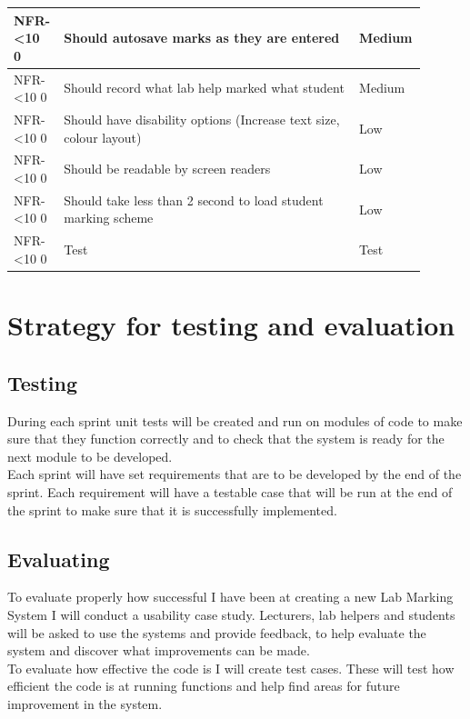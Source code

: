 \documentclass[12pt]{article}  %
\newcommand{\rid}[1]{\centering #1-\ifnum\value{requirement}<10 0\fi\arabic{requirement} \stepcounter{requirement}}
\begin{document}
\begin{spacing}{1.2}
\begin{longtable}{|p{0.1\linewidth}|p{0.7\linewidth}|p{0.1\linewidth}|}
\rid{NFR} & Should autosave marks as they are entered & Medium\\ \hline

\rid{NFR} & Should record what lab help marked what student & Medium\\ \hline

\rid{NFR} & Should have disability options (Increase text size, colour layout) & Low\\ \hline

\rid{NFR} & Should be readable by screen readers & Low\\ \hline

\rid{NFR} & Should take less than 2 second to load student marking scheme & Low\\ \hline

\rid{NFR} & Test&Test\\ \hline

 
\end{longtable}
\end{spacing}

\setcounter{requirement}{1}




\newpage

\section{Strategy for testing and evaluation}

\subsection{Testing}
During each sprint unit tests will be created and run on modules of code to make sure that they function correctly and to check that the system is ready for the next module to be developed.\\
Each sprint will have set requirements that are to be developed by the end of the sprint. Each requirement will have a testable case that will be run at the end of the sprint to make sure that it is successfully implemented.


\subsection{Evaluating}
To evaluate properly how successful I have been at creating a new Lab Marking System I will conduct a usability case study. Lecturers, lab helpers and students will be asked to use the systems and provide feedback, to help evaluate the system and discover what improvements can be made.\\
To evaluate how effective the code is I will create test cases. These will test how efficient the code is at running functions and help find areas for future improvement in the system.
\end{document}
